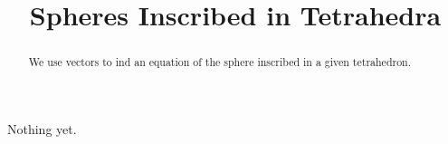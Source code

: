 \documentclass{ximera}
\title{Spheres Inscribed in Tetrahedra}
\begin{document}
\begin{abstract}
We use vectors to ind an equation of the sphere inscribed in a given tetrahedron.
\end{abstract}
\maketitle

Nothing yet.
\end{document}
